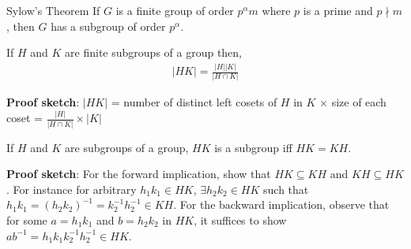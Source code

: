 \documentclass[titlepage, 12pt]{book}
\begin{document}
\begin{theorem}{Sylow's Theorem}{}
    If $G$ is a finite group of order $p^\alpha m$ where $p$ is a prime and
    $p\nmid m$, then $G$ has a subgroup of order $p^\alpha$.
\end{theorem}
\begin{proposition}{}{}
    If $H$ and $K$ are finite subgroups of a group then,
    \begin{gather*}
        |HK| = \frac{|H||K|}{|H\cap K|}
    \end{gather*}
\end{proposition}{}{}
\textbf{Proof sketch}: $|HK|$ = number of distinct left cosets of $H$ in $K$
$\times$ size of each coset = $\frac{|H|}{|H\cap K|}\times |K|$
\begin{proposition}{}{}
    If $H$ and $K$ are subgroups of a group, $HK$ is a subgroup iff $HK = KH$.
\end{proposition}
\textbf{Proof sketch}:  For the forward implication, show that $HK\subseteq KH$
and $KH\subseteq HK$. For instance for arbitrary $h_1k_1\in HK$, $\exists
h_2k_2\in HK$ such that $h_1k_1 = (h_2k_2)^{-1} = k_2^{-1}h_2^{-1}\in KH$. For
the backward implication, observe that for some $a = h_1k_1$ and $b = h_2k_2$ in
$HK$, it suffices to show $ab^{-1} = h_1k_1k_2^{-1}h_2^{-1}\in HK$.
\end{document}
